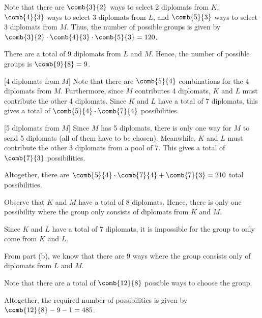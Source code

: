 \begin{solution}
    \begin{ppart}
        Note that there are $\comb{3}{2}$ ways to select 2 diplomats from $K$, $\comb{4}{3}$ ways to select 3 diplomats from $L$, and $\comb{5}{3}$ ways to select 3 diplomats from $M$. Thus, the number of possible groups is given by $\comb{3}{2} \cdot \comb{4}{3} \cdot \comb{5}{3} = 120$.
    \end{ppart}
    \begin{ppart}
        There are a total of 9 diplomats from $L$ and $M$. Hence, the number of possible groups is $\comb{9}{8} = 9$.
    \end{ppart}
    \begin{ppart}
        [4 diplomats from $M$] Note that there are $\comb{5}{4}$ combinations for the 4 diplomats from $M$. Furthermore, since $M$ contributes 4 diplomats, $K$ and $L$ must contribute the other 4 diplomats. Since $K$ and $L$ have a total of 7 diplomats, this gives a total of $\comb{5}{4} \cdot \comb{7}{4}$ possibilities.

        [5 diplomats from $M$] Since $M$ has 5 diplomats, there is only one way for $M$ to send 5 diplomats (all of them have to be chosen). Meanwhile, $K$ and $L$ must contribute the other 3 diplomats from a pool of 7. This gives a total of $\comb{7}{3}$ possibilities.

        Altogether, there are $\comb{5}{4} \cdot \comb{7}{4} + \comb{7}{3} = 210$ total possibilities.
    \end{ppart}
    \begin{ppart}
        Observe that $K$ and $M$ have a total of 8 diplomats. Hence, there is only one possibility where the group only consists of diplomats from $K$ and $M$.

        Since $K$ and $L$ have a total of 7 diplomats, it is impossible for the group to only come from $K$ and $L$.

        From part (b), we know that there are 9 ways where the group consists only of diplomats from $L$ and $M$.

        Note that there are a total of $\comb{12}{8}$ possible ways to choose the group.

        Altogether, the required number of possibilities is given by $\comb{12}{8} - 9 - 1 = 485$.
    \end{ppart}
\end{solution}

